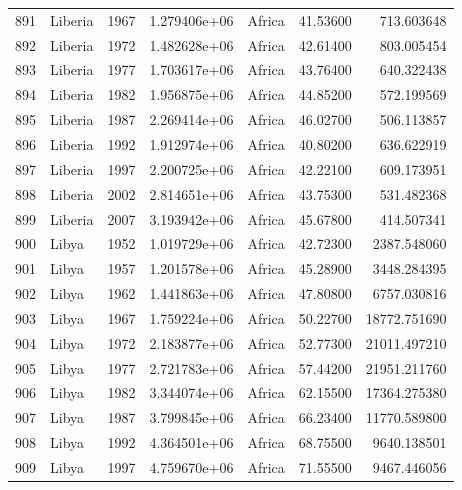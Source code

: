 \documentclass[
  letterpaper,
  DIV=11,
  numbers=noendperiod]{scrreprt}
\begin{document}
\begin{tabular}{llrrlrr}
891  &                   Liberia &  1967 &  1.279406e+06 &    Africa &  41.53600 &     713.603648 \\
892  &                   Liberia &  1972 &  1.482628e+06 &    Africa &  42.61400 &     803.005454 \\
893  &                   Liberia &  1977 &  1.703617e+06 &    Africa &  43.76400 &     640.322438 \\
894  &                   Liberia &  1982 &  1.956875e+06 &    Africa &  44.85200 &     572.199569 \\
895  &                   Liberia &  1987 &  2.269414e+06 &    Africa &  46.02700 &     506.113857 \\
896  &                   Liberia &  1992 &  1.912974e+06 &    Africa &  40.80200 &     636.622919 \\
897  &                   Liberia &  1997 &  2.200725e+06 &    Africa &  42.22100 &     609.173951 \\
898  &                   Liberia &  2002 &  2.814651e+06 &    Africa &  43.75300 &     531.482368 \\
899  &                   Liberia &  2007 &  3.193942e+06 &    Africa &  45.67800 &     414.507341 \\
900  &                     Libya &  1952 &  1.019729e+06 &    Africa &  42.72300 &    2387.548060 \\
901  &                     Libya &  1957 &  1.201578e+06 &    Africa &  45.28900 &    3448.284395 \\
902  &                     Libya &  1962 &  1.441863e+06 &    Africa &  47.80800 &    6757.030816 \\
903  &                     Libya &  1967 &  1.759224e+06 &    Africa &  50.22700 &   18772.751690 \\
904  &                     Libya &  1972 &  2.183877e+06 &    Africa &  52.77300 &   21011.497210 \\
905  &                     Libya &  1977 &  2.721783e+06 &    Africa &  57.44200 &   21951.211760 \\
906  &                     Libya &  1982 &  3.344074e+06 &    Africa &  62.15500 &   17364.275380 \\
907  &                     Libya &  1987 &  3.799845e+06 &    Africa &  66.23400 &   11770.589800 \\
908  &                     Libya &  1992 &  4.364501e+06 &    Africa &  68.75500 &    9640.138501 \\
909  &                     Libya &  1997 &  4.759670e+06 &    Africa &  71.55500 &    9467.446056 \\

\end{tabular}
\end{document}
